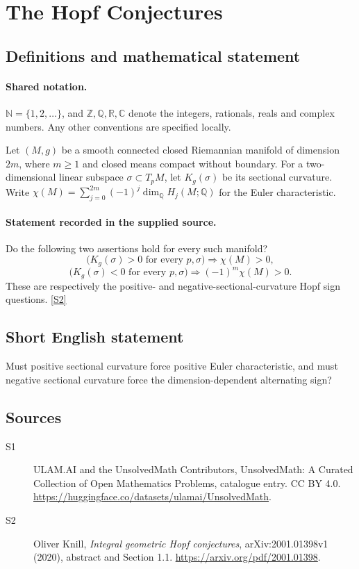 \documentclass[11pt]{article}
\newcommand{\sref}[2]{\hyperlink{source:#1:#2}{[S#2]}}
\begin{document}
\section{The Hopf Conjectures}\label{statement}

\subsection{Definitions and mathematical statement}

\paragraph{Shared notation.}$\mathbb N=\{1,2,\ldots\}$, and $\mathbb Z,\mathbb Q,\mathbb R,\mathbb C$ denote the integers, rationals, reals and complex numbers. Any other conventions are specified locally.


Let $(M,g)$ be a smooth connected closed Riemannian manifold of dimension $2m$, where $m\geq1$ and closed means compact without boundary. For a two-dimensional linear subspace $\sigma\subset T_pM$, let $K_g(\sigma)$ be its sectional curvature. Write $\chi(M)=\sum_{j=0}^{2m}(-1)^j\dim_{\mathbb Q}H_j(M;\mathbb Q)$ for the Euler characteristic.
\paragraph{Statement recorded in the supplied source.}
Do the following two assertions hold for every such manifold?
\[
\bigl(K_g(\sigma)>0\text{ for every }p,\sigma\bigr)\Longrightarrow\chi(M)>0,
\]
\[
\bigl(K_g(\sigma)<0\text{ for every }p,\sigma\bigr)\Longrightarrow(-1)^m\chi(M)>0.
\]
These are respectively the positive- and negative-sectional-curvature Hopf sign questions. \sref{statement}{2}

\subsection{Short English statement}
Must positive sectional curvature force positive Euler characteristic, and must negative sectional curvature force the dimension-dependent alternating sign?
\subsection{Sources}
\begin{description}
\item[\hypertarget{source:statement:1}{S1}] ULAM.AI and the UnsolvedMath Contributors, UnsolvedMath: A Curated Collection of Open Mathematics Problems, catalogue entry. CC BY 4.0. \url{https://huggingface.co/datasets/ulamai/UnsolvedMath}.
\item[\hypertarget{source:statement:2}{S2}] Oliver Knill, \emph{Integral geometric Hopf conjectures}, arXiv:2001.01398v1 (2020), abstract and Section 1.1. \url{https://arxiv.org/pdf/2001.01398}.
\end{description}
\label{end:statement}
\end{document}
